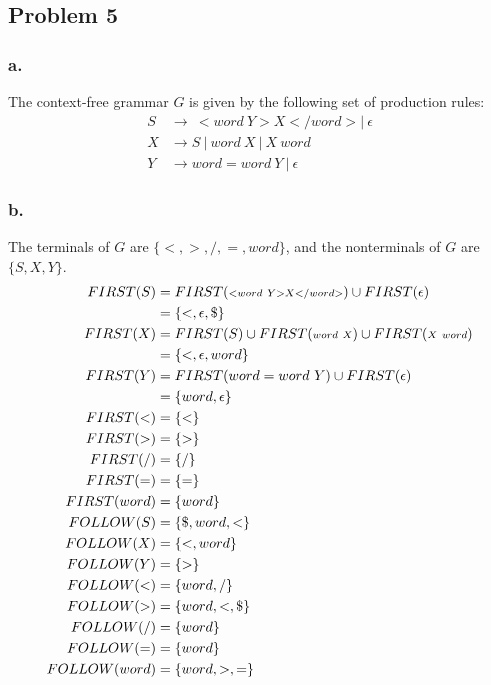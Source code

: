 \documentclass{article}
\begin{document}
	\newpage
	\subsection*{Problem 5}
	\subsubsection*{a.}
	The context-free grammar $G$ is given by the following set of production rules:
	\begin{align*}
		S &\rightarrow \ <word\ Y>X</word> | \ \epsilon\\
		X &\rightarrow S \ |\ word\ X \ |\ X\ word \\
		Y &\rightarrow word = word ~Y~ |~ \epsilon 
	\end{align*}

	\subsubsection*{b.}
	The terminals of $G$ are $\{<, >, /, =, word\}$, and the nonterminals of $G$ are $\{S, X, Y\}$.
	\begin{align*}
		FIRST(S) &= FIRST( {\scriptstyle <word\ Y>X</word>} ) \cup FIRST(  \epsilon ) \\
		& = \{<, \epsilon, \$ \}\\
		FIRST(X) &= FIRST( S ) \cup FIRST({\scriptstyle word\ X}) \cup FIRST( {\scriptstyle X\ word} ) \\
		&= \{<, \epsilon, word\}\\
		FIRST(Y) &= FIRST( word = word ~Y  ) \cup FIRST( \epsilon  ) \\
		&= \{word, \epsilon \} \\
		FIRST(<) &= \{< \} \\
		FIRST(>) &= \{> \} \\
		FIRST(/) &= \{/ \} \\
		FIRST(=) &= \{= \} \\
		FIRST(word) &= \{word \} \medskip\\
		FOLLOW(S) & = \{ \$, word, < \} \\
		FOLLOW(X) &= \{<, word\}\\
		FOLLOW(Y) &= \{> \} \\
		FOLLOW(<) &= \{word, / \} \\
		FOLLOW(>) &= \{word, <, \$ \} \\
		FOLLOW(/) &= \{ word \} \\
		FOLLOW(=) &= \{word \} \\
		FOLLOW(word) &= \{word, >, = \} 
	\end{align*}
\end{document}
